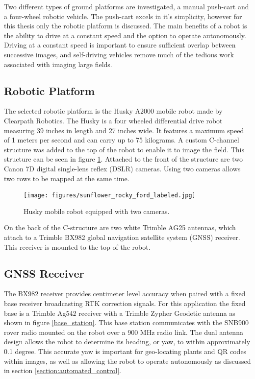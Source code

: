 Two different types of ground platforms are investigated, a manual push-cart and a four-wheel robotic vehicle.  The push-cart excels in it's simplicity, however for this thesis only the robotic platform is discussed.  The main benefits of a robot is the ability to drive at a constant speed and the option to operate autonomously.  Driving at a constant speed is important to ensure sufficient overlap between successive images, and self-driving vehicles remove much of the tedious work associated with imaging large fields.  

\subsection{Robotic Platform}

The selected robotic platform is the Husky A2000 mobile robot made by Clearpath Robotics.  The Husky is a four wheeled differential drive robot measuring 39 inches in length and 27 inches wide.  It features a maximum speed of 1 meters per second and can carry up to 75 kilograms.  A custom C-channel structure was added to the top of the robot to enable it to image the field.  This structure can be seen in figure \ref{husky_rocky_ford}.  Attached to the front of the structure are two Canon 7D digital single-lens reflex (DSLR) cameras.  Using two cameras allows two rows to be mapped at the same time. 

\begin{figure}[htb]
	\centering
    \texttt{[image: figures/sunflower\_rocky\_ford\_labeled.jpg]}
    \caption[Husky]{Husky mobile robot equipped with two cameras.}
    \label{husky_rocky_ford}
\end{figure}

On the back of the C-structure are two white Trimble AG25 antennas, which attach to a Trimble BX982 global navigation satellite system (GNSS) receiver.  This receiver is mounted to the top of the robot.   

\subsection{GNSS Receiver}

The BX982 receiver provides centimeter level accuracy when paired with a fixed base receiver broadcasting RTK correction signals.  For this application the fixed base is a Trimble Ag542 receiver with a Trimble Zypher Geodetic antenna as shown in figure \ref{base_station}.  This base station communicates with the SNB900 rover radio mounted on the robot over a 900 MHz radio link.   The dual antenna design allows the robot to determine its heading, or yaw, to within approximately 0.1 degree.  This accurate yaw is important for geo-locating plants and QR codes within images, as well as allowing the robot to operate autonomously as discussed in section \ref{section:automated_control}. 

